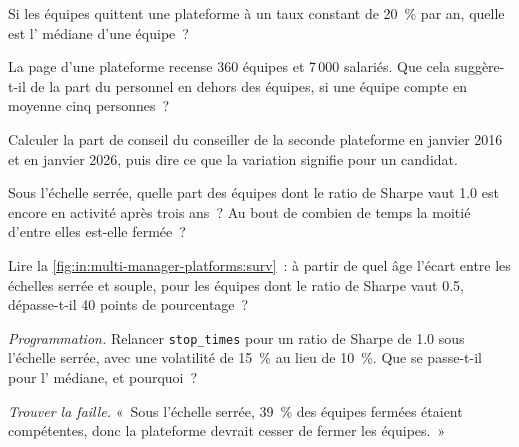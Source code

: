 \begin{exercise}[$\star$]\label{exo:in:multi-manager-platforms:2}
Si les équipes quittent une plateforme à un taux constant de 20~\% par an, quelle est l' médiane d'une équipe~?
\end{exercise}

\begin{exercise}[$\star$]\label{exo:in:multi-manager-platforms:3}
La page d'une plateforme recense 360 équipes et 7\,000 salariés. Que cela suggère-t-il de la part du personnel en dehors des
équipes, si une équipe compte en moyenne cinq personnes~?
\end{exercise}

\begin{exercise}[$\star\star$]\label{exo:in:multi-manager-platforms:4}
Calculer la part de conseil du conseiller de la seconde plateforme en janvier 2016 et en janvier 2026, puis dire ce que la variation
signifie pour un candidat.
\end{exercise}

\begin{exercise}[$\star\star$]\label{exo:in:multi-manager-platforms:5}
Sous l'échelle serrée, quelle part des équipes dont le ratio de Sharpe vaut 1.0 est encore en activité après trois ans~? Au bout de
combien de temps la moitié d'entre elles est-elle fermée~?
\end{exercise}

\begin{exercise}[$\star\star$]\label{exo:in:multi-manager-platforms:6}
Lire la \cref{fig:in:multi-manager-platforms:surv}~: à partir de quel âge l'écart entre les échelles serrée et souple, pour les équipes
dont le ratio de Sharpe vaut 0.5, dépasse-t-il 40 points de pourcentage~?
\end{exercise}

\begin{exercise}[$\star\star\star$]\label{exo:in:multi-manager-platforms:7}
\emph{Programmation.} Relancer \texttt{stop\_times} pour un ratio de Sharpe de 1.0 sous l'échelle serrée, avec une volatilité de 15~\%
au lieu de 10~\%. Que se passe-t-il pour l' médiane, et pourquoi~?
\end{exercise}

\begin{exercise}[$\star\star\star$]\label{exo:in:multi-manager-platforms:8}
\emph{Trouver la faille.} «~Sous l'échelle serrée, 39~\% des équipes fermées étaient compétentes, donc la plateforme devrait cesser de fermer
les équipes.~»
\end{exercise}

